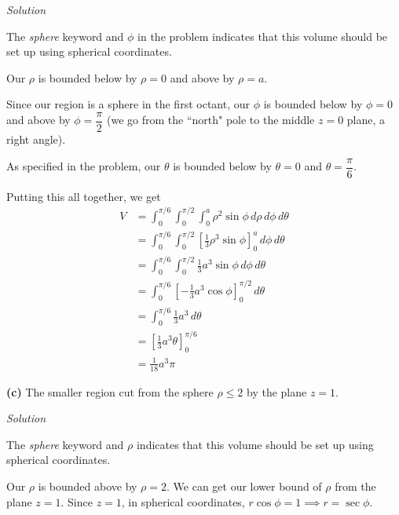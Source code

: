 \documentclass{article}
\newcommand{\lrb}[1]{\left[ #1 \right]}
\newcommand{\Solution}{\textit{Solution}}
\begin{document}
\Solution

The \textit{sphere} keyword and $\phi$ in the problem indicates that this volume should be set up using spherical coordinates.

Our $\rho$ is bounded below by $\rho = 0$ and above by $\rho = a$.

Since our region is a sphere in the first octant, our $\phi$ is bounded below by $\phi = 0$ and above by $\phi = \dfrac{\pi}{2}$ (we go from the ``north" pole to the middle $z=0$ plane, a right angle).

As specified in the problem, our $\theta$ is bounded below by $\theta = 0$ and $\theta = \dfrac{\pi}{6}$.

Putting this all together, we get
\begin{align*}
    V&=\int_0^{\pi/6}\int_0^{\pi/2}\int_0^{a}\rho^2\sin\phi\,d\rho\,d\phi\,d\theta\\
    &=\int_0^{\pi/6}\int_0^{\pi/2} \lrb{\frac{1}{3}\rho^3 \sin\phi}_0^a\,d\phi \,d\theta\\
    &=\int_0^{\pi/6}\int_0^{\pi/2} \frac{1}{3}a^3\sin\phi\,d\phi\,d\theta\\
    &=\int_0^{\pi/6}\lrb{-\frac{1}{3}a^3\cos\phi}_0^{\pi/2}\,d\theta\\
    &=\int_0^{\pi/6} \frac{1}{3}a^3\,d\theta\\
    &=\lrb{\frac{1}{3}a^3\theta}_0^{\pi/6}\\
    &=\boxed{\frac{1}{18}a^3\pi}
\end{align*}
{}\textbf{(c)} The smaller region cut from the sphere $\rho \leq 2$ by the plane $z=1$.

\Solution

The \textit{sphere} keyword and $\rho$ indicates that this volume should be set up using spherical coordinates.

Our $\rho$ is bounded above by $\rho = 2$. We can get our lower bound of $\rho $ from the plane $z=1$. Since $z=1$, in spherical coordinates, $r\cos\phi = 1\implies r=\sec \phi$.
\end{document}

